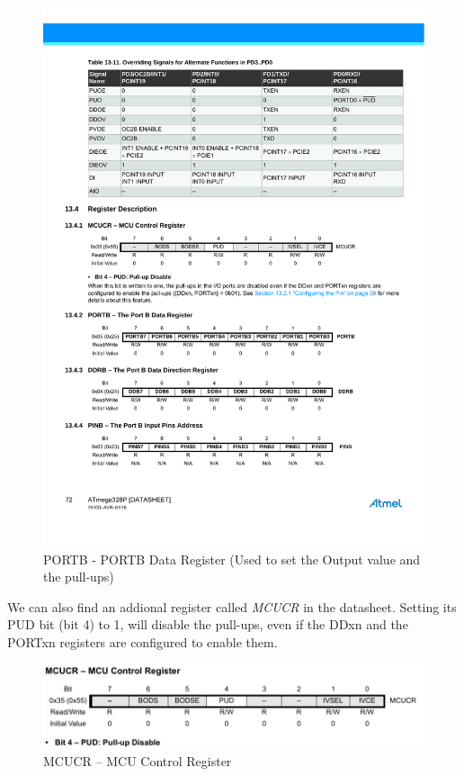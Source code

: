 \begin{figure}[H]
    \centering
    \includegraphics[width = \textwidth]{Graphics/MICROS/Practice 1/DATSHEET/PORTB.pdf}
    \caption{PORTB - PORTB Data Register (Used to set the Output value and the pull-ups)}
    \label{fig:PORTB}
\end{figure}

We can also find an addional register called \textit{MCUCR} in the datasheet. Setting its PUD bit (bit 4) to 1, will disable the pull-ups, even if the DDxn and the PORTxn registers are configured to enable them. 

\begin{figure}[H]
    \centering
    \includegraphics[width = \textwidth]{Graphics/MICROS/Practice 1/DATSHEET/MCUCR.pdf}
    \caption{MCUCR – MCU Control Register}
    \label{fig:MCUR}
\end{figure}


